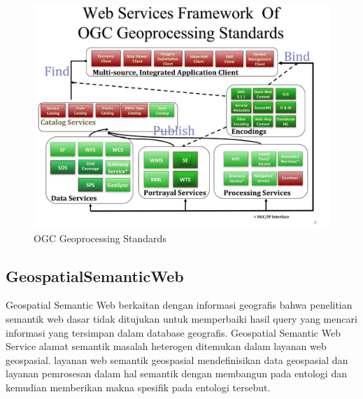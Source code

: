 \begin{figure}[ht]
	\centerline{\includegraphics[width=1\textwidth]{figures/framework.JPG}}
	\caption{OGC Geoprocessing Standards}
	\label{framework}
	\end{figure}
	
\subsection{GeospatialSemanticWeb}
Geospatial Semantic Web berkaitan dengan informasi geografis bahwa penelitian semantik web dasar tidak ditujukan untuk memperbaiki 
hasil query yang mencari informasi yang tersimpan dalam database geografis. Geospatial Semantic Web Service alamat semantik masalah heterogen ditemukan dalam layanan web geospasial. layanan web semantik geospasial mendefinisikan data geospasial dan layanan pemrosesan dalam hal semantik dengan membangun 
pada entologi dan kemudian memberikan makna spesifik pada entologi tersebut. \cite{lupp2008open} 

